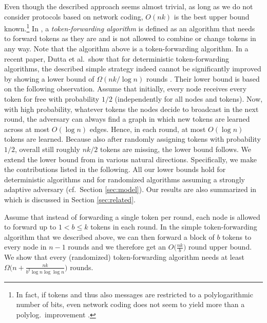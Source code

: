 \documentclass{llncs}
\renewcommand{\paragraph}[1]{\medskip\noindent{\bf #1\ }}
\begin{document}
Even though the described approach seems almost trivial, as long as we
do not consider protocols based on network coding, $O(nk)$ is the best
upper bound known.\footnote{In fact, if tokens and thus also messages
    are restricted to a polylogarithmic number of bits, even network
    coding does not seem to yield more than a polylog.\
    improvement \cite{AnalyzingNC,HK}.} In \cite{KLO}, a
\emph{token-forwarding algorithm} is defined as an algorithm that
needs to forward tokens as they are and is not allowed to combine or
change tokens in any way. Note that the algorithm above is a
token-forwarding algorithm. In a recent paper, Dutta et al.\ show that
for deterministic token-forwarding algorithms, the described simple
strategy indeed cannot be significantly improved by showing a lower
bound of $\Omega(nk/\log n)$ rounds \cite{LBarxiv}. Their lower bound
is based on the following observation. Assume that initially, every
node receives every token for free with probability $1/2$
(independently for all nodes and tokens). Now, with high probability,
whatever tokens the nodes decide to broadcast in the next round, the
adversary can always find a graph in which new tokens are learned
across at most $O(\log n)$ edges. Hence, in each round, at most
$O(\log n)$ tokens are learned.  Because also after randomly assigning
tokens with probability $1/2$, overall still roughly $nk/2$ tokens are
missing, the lower bound follows. We extend the
lower bound from \cite{LBarxiv} in various natural
directions. Specifically, we make the contributions listed in the
following. All our lower bounds hold for deterministic algorithms and
for randomized algorithms assuming a strongly adaptive adversary (cf.\
Section \ref{sec:model}). Our results are also summarized in
\Cref{table:bounds} which is discussed in Section \ref{sec:related}.

\paragraph{Multiple Tokens per Round:} Assume that instead of
forwarding a single token per round, each node is allowed to forward
up to $1<b\leq k$ tokens in each round. In the simple token-forwarding
algorithm that we described above, we can then forward a block of $b$
tokens to every node in $n-1$ rounds and we therefore get an
$O\big(\frac{nk}{b}\big)$ round upper bound.  We show that every
(randomized) token-forwarding algorithm needs at least $\Omega\big(n
+ \frac{nk}{b^2\log n\log\log n}\big)$ rounds. 
\end{document}
